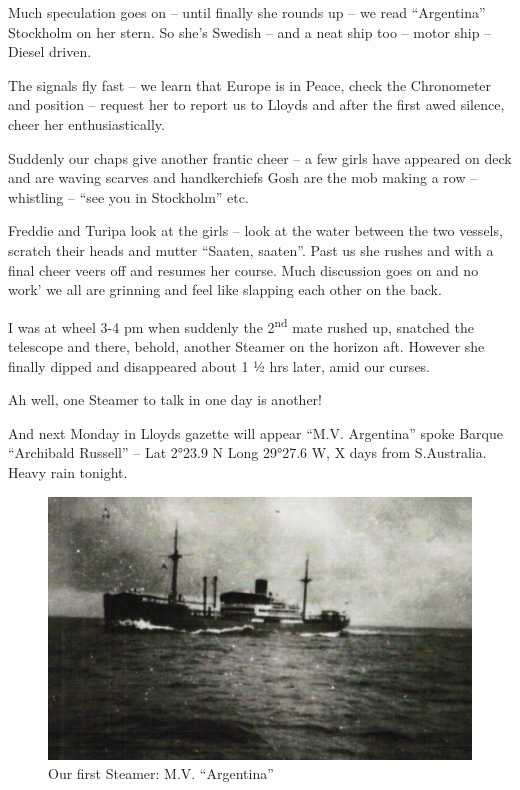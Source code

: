 \documentclass[
  11pt,
  msmallroyalvopaper
]{memoir}
\begin{document}
Much speculation goes on -- until finally she rounds up -- we read
``Argentina'' Stockholm on her stern. So she's Swedish -- and a neat
ship too -- motor ship -- Diesel driven.

The signals fly fast -- we learn that Europe is in Peace, check the
Chronometer and position -- request her to report us to Lloyds and after
the first awed silence, cheer her enthusiastically.

Suddenly our chaps give another frantic cheer -- a few girls have
appeared on deck and are waving scarves and handkerchiefs Gosh are the
mob making a row -- whistling -- ``see you in Stockholm'' etc.

Freddie and Turipa look at the girls -- look at the water between the
two vessels, scratch their heads and mutter ``Saaten, saaten''. Past us
she rushes and with a final cheer veers off and resumes her course. Much
discussion goes on and no work' we all are grinning and feel like
slapping each other on the back.

I was at wheel 3-4 pm when suddenly the 2\textsuperscript{nd} mate
rushed up, snatched the telescope and there, behold, another Steamer on
the horizon aft. However she finally dipped and disappeared about 1 ½
hrs later, amid our curses.

Ah well, one Steamer to talk in one day is another!

And next Monday in Lloyds gazette will appear ``M.V. Argentina'' spoke
Barque ``Archibald Russell'' -- Lat 2°23.9 N Long 29°27.6 W, X days from
S.Australia. Heavy rain tonight.

\begin{figure}
\centering
\includegraphics{./images/image027.png}
\caption{Our first Steamer: M.V. ``Argentina''}
\end{figure}
\end{document}
